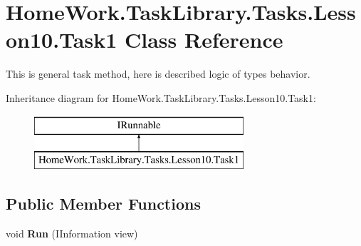 \hypertarget{class_home_work_1_1_task_library_1_1_tasks_1_1_lesson10_1_1_task1}{}\section{Home\+Work.\+Task\+Library.\+Tasks.\+Lesson10.\+Task1 Class Reference}
\label{class_home_work_1_1_task_library_1_1_tasks_1_1_lesson10_1_1_task1}


This is general task method, here is described logic of types behavior.  


Inheritance diagram for Home\+Work.\+Task\+Library.\+Tasks.\+Lesson10.\+Task1\+:\begin{figure}[H]
\begin{center}
\leavevmode
\includegraphics[height=2.000000cm]{class_home_work_1_1_task_library_1_1_tasks_1_1_lesson10_1_1_task1}
\end{center}
\end{figure}
\subsection*{Public Member Functions}
\begin{DoxyCompactItemize}
\item 
\mbox{\label{class_home_work_1_1_task_library_1_1_tasks_1_1_lesson10_1_1_task1_aa0da5f3ac916d32663021ff2288ca6b1}} 
void {\bfseries Run} (I\+Information view)
\end{DoxyCompactItemize}
